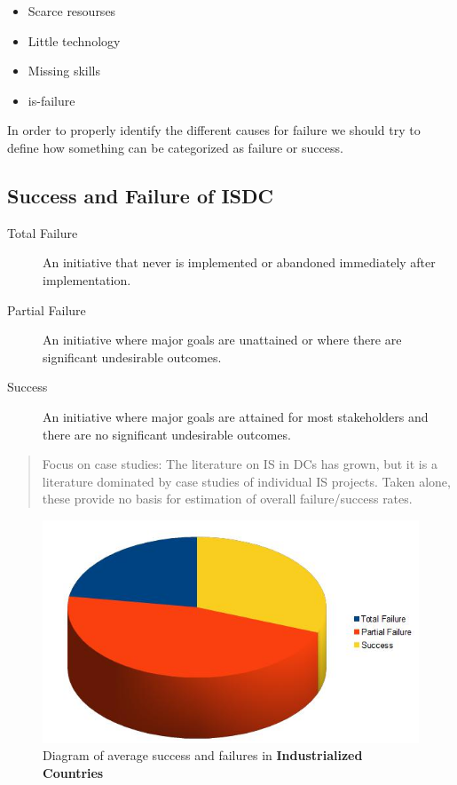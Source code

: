\begin{itemize}
\item Scarce resourses
\item Little technology
\item Missing skills
\item \gls{is}-failure
\end{itemize}

In order to properly identify the different causes for failure we should try to define how something can be categorized as failure or success.

\subsection{Success and Failure of ISDC}
\label{successandfailure}
\begin{description}
\item[Total Failure] An initiative that never is implemented or abandoned immediately after implementation.
\item[Partial Failure] An initiative where major goals are unattained or where there are significant undesirable outcomes.
\item[Success] An initiative where major goals are attained for most stakeholders and there are no significant undesirable outcomes.
\end{description}
\begin{quotation}
Focus on case studies: The literature on IS in
DCs has grown, but it is a literature dominated by
case studies of individual IS projects. Taken alone,
these provide no basis for estimation of overall
failure/success rates.\cite{rh:isdc}
\end{quotation}
\begin{figure}
\centering
\includegraphics[width=\textwidth]{literature/img/failChart}
\caption{Diagram of average success and failures in \textbf{Industrialized Countries}}
\label{fig:failchart}
\end{figure}

